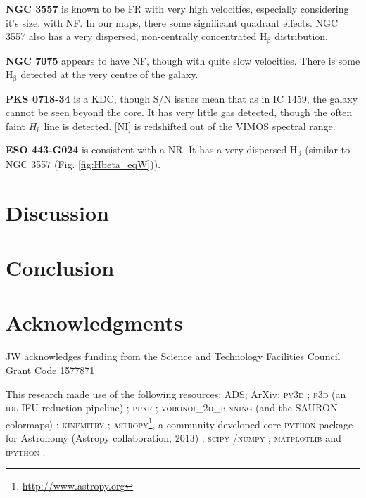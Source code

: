 \documentclass[fleqn,usenatbib,useAMS]{mnras}
\begin{document}
	\textbf{NGC 3557} is known to be FR with very high velocities, especially considering it's size, with NF. In our maps, there some significant quadrant effects. NGC 3557 also has a very dispersed, non-centrally concentrated H$_\mathrm{\beta}$ distribution. 

	\textbf{NGC 7075} appears to have NF, though with quite slow velocities. There is some H$_\mathrm{\beta}$ detected at the very centre of the galaxy. 

	\textbf{PKS 0718-34} is a KDC, though S/N issues mean that as in IC 1459, the galaxy cannot be seen beyond the core. It has very little gas detected, though the often faint $H_\mathrm{\delta}$ line is detected. [NI] is redshifted out of the VIMOS spectral range.

	\textbf{ESO 443-G024} is consistent with a NR. It has a very dispersed H$_\mathrm{\beta}$ (similar to NGC 3557 (Fig. \ref{fig:Hbeta_eqW})).


	


\section{Discussion}
	\label{sec:discuss}

\section{Conclusion}
	\label{sec:conc}



\section*{Acknowledgments}
JW acknowledges funding from the Science and Technology Facilities Council Grant Code 1577871

This research made use of the following resources: ADS; ArXiv; \textsc{py3d} \citep{Sanchez2011, Husemann2013, Husemann2014}; \textsc{p3d} (an \textsc{idl} IFU reduction pipeline) \citep{Sandin2010, Sandin2011}; \textsc{ppxf} \citep{Cappellari2004}; \textsc{voronoi\_2d\_binning} (and the SAURON colormaps) \citep{Cappellari2003}; \textsc{kinemitry} \citep{Krajnovi2006}; \textsc{astropy}\footnote{\url{http://www.astropy.org}}, a community-developed core \textsc{python} package for Astronomy (Astropy collaboration, 2013) \citep{TheAstropyCollaboration2013}; \textsc{scipy} \citep{Oliphant2007, Millman2011}/\textsc{numpy} \citep{VanderWalt2011}; \textsc{matplotlib} \citep{Hunter2007} and \textsc{ipython} \citep{Perez2007}. %



{}

\appendix


\end{document}
